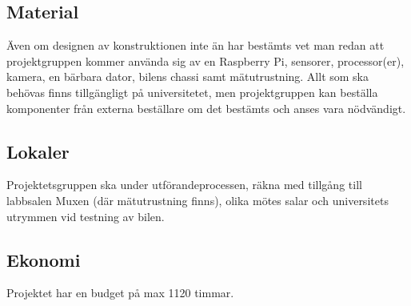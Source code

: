 \documentclass[projektplan/plan.tex]{subfiles}
\begin{document}
\subsection{Material}
Även om designen av konstruktionen inte än har bestämts vet man redan att
projektgruppen kommer använda sig av en Raspberry Pi, sensorer, processor(er),
kamera, en bärbara dator, bilens chassi samt mätutrustning. Allt som ska
behövas finns tillgängligt  på universitetet, men projektgruppen kan beställa
komponenter från externa beställare om det bestämts och anses vara nödvändigt.

\subsection{Lokaler}
Projektetsgruppen ska under utförandeprocessen, räkna med tillgång till
labbsalen Muxen (där mätutrustning finns), olika mötes salar och universitets
utrymmen vid testning av bilen.

\subsection{Ekonomi}
Projektet har en budget på max 1120 timmar.
\end{document}
